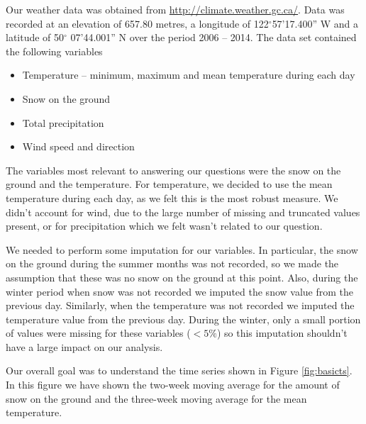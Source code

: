 \documentclass[12pt,twoside]{article}
\begin{document}
{Our weather data was obtained from \url{http://climate.weather.gc.ca/}. Data was recorded at an elevation of 657.80 metres, a longitude of 122$^{\circ}$57'17.400'' W and a latitude of 50$^{\circ}$ 07'44.001'' N over the period 2006 -- 2014. The data set contained the following variables

\begin{itemize}
\item Temperature -- minimum, maximum and mean temperature during each day
\item Snow on the ground 
\item Total precipitation 
\item Wind speed and direction
\end{itemize}

\vspace{-3mm}
\medskip The variables most relevant to answering our questions were the snow on the ground and the temperature. For temperature, we decided to use the mean temperature during each day, as we felt this is the most robust measure. We didn't account for wind, due to the large number of missing and truncated values present, or for precipitation which we felt wasn't related to our question. 

We needed to perform some imputation for our variables. In particular, the snow on the ground during the summer months was not recorded, so we made the assumption that these was no snow on the ground at this point. Also, during the winter period when snow was not recorded we imputed the snow value from the previous day. Similarly, when the temperature was not recorded we imputed the temperature value from the previous day. During the winter, only a small portion of values were missing for these variables ($<5\%$) so this imputation shouldn't have a large impact on our analysis.

Our overall goal was to understand the time series shown in Figure \ref{fig:basicts}. In this figure we have shown the two-week moving average for the amount of snow on the ground and the three-week moving average for the mean temperature.


}
\end{document}
